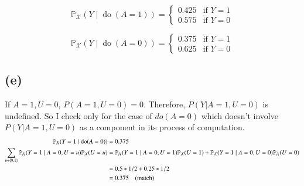 \documentclass[10pt]{article}
\begin{document}
\begin{equation}
    \mathbb{P}_{\mathcal{X}}(Y \mid \operatorname{do}(A=1))=
    \begin{cases}
        0.425 & \text{if $Y=1$} \\
        0.575 & \text{if $Y=0$}
    \end{cases}
  \end{equation}

  \begin{equation}
    \mathbb{P}_{\mathcal{X}}(Y \mid \operatorname{do}(A=0))=
    \begin{cases}
        0.375 & \text{if $Y=1$} \\
        0.625 & \text{if $Y=0$}
    \end{cases}
  \end{equation}

\subsection{(e)}
If $A=1, U=0$, $P(A=1, U=0)=0$.  Therefore, $P(Y|A=1, U=0)$ is undefined. So I check only for the case of $do(A=0)$ which doesn't involve $P(Y|A=1, U=0)$ as a component in its process of computation. \\
\begin{align*}
    \mathbb{P}_{\mathcal{X}}(Y=1 \mid \operatorname{do}(A=0))&=0.375\\
    \sum_{u \in\{0,1\}} \mathbb{P}_{\mathcal{X}}(Y=1 \mid A=0, U=u) \mathbb{P}_{\mathcal{X}}(U=u)&=\mathbb{P}_{\mathcal{X}}(Y=1 \mid A=0, U=1) \mathbb{P}_{\mathcal{X}}(U=1) + \mathbb{P}_{\mathcal{X}}(Y=1 \mid A=0, U=0) \mathbb{P}_{\mathcal{X}}(U=0)\\
    &= 0.5 * 1/2 + 0.25 * 1/2\\
    &= 0.375 \text{\quad (match)}
\end{align*}
\end{document}
